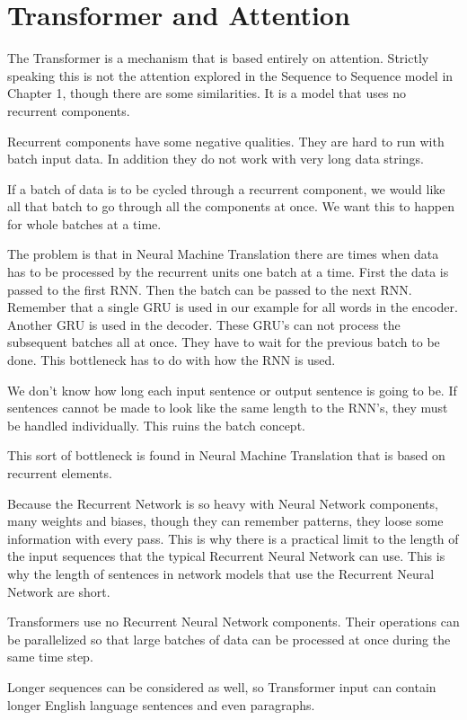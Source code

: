 
\section{Transformer and Attention}

The Transformer is a mechanism that is based entirely on attention. Strictly speaking this is not the attention explored in the Sequence to Sequence model in Chapter 1, though there are some similarities. It is a model that uses no recurrent components.

Recurrent components have some negative qualities. They are hard to run with batch input data. In addition they do not work with very long data strings. 

If a batch of data is to be cycled through a recurrent component, we would like all that batch to go through all the components at once.  We want this to happen for whole batches at a time.

The problem is that in Neural Machine Translation there are times when data has to be processed by the recurrent units one batch at a time. First the data is passed to the first RNN. Then the batch can be passed to the next RNN. Remember that a single GRU is used in our example for all words in the encoder. Another GRU is used in the decoder. These GRU's can not process the subsequent batches all at once. They have to wait for the previous batch to be done. This bottleneck has to do with how the RNN is used. 

We don't know how long each input sentence or output sentence is going to be. If sentences cannot be made to look like the same length to the RNN's, they must be handled individually. This ruins the batch concept.

This sort of bottleneck is found in Neural Machine Translation that is based on recurrent elements.

Because the Recurrent Network is so heavy with Neural Network components, many weights and biases, though they can remember patterns, they loose some information with every pass. This is why there is a practical limit to the length of the input sequences that the typical Recurrent Neural Network can use. This is why the length of sentences in network models that use the Recurrent Neural Network are short.

Transformers use no Recurrent Neural Network components. Their operations can be parallelized so that large batches of data can be processed at once during the same time step. 

Longer sequences can be considered as well, so Transformer input can contain longer English language sentences and even paragraphs. 

